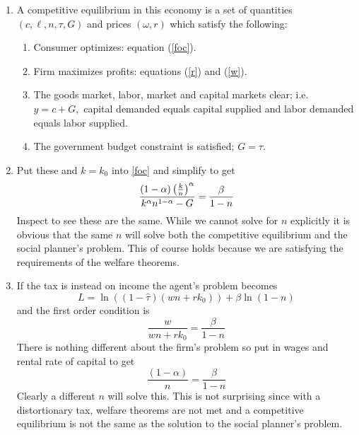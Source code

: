 \documentclass{article}
\begin{document}
\begin{enumerate}
\begin{enumerate}
\item A competitive equilibrium in this economy is a set of quantities $%
\left( c,\ell ,n,\tau ,G\right) $ and prices $\left( \omega ,r\right) $
which satisfy the following:

\begin{enumerate}
\item Consumer optimizes: equation (\ref{foc}).

\item Firm maximizes profits: equations (\ref{r}) and (\ref{w}).

\item The goods market, labor, market and capital markets clear; i.e. $%
y=c+G, $ capital demanded equals capital supplied and labor demanded equals
labor supplied.

\item The government budget constraint is satisfied; $G=\tau $.
\end{enumerate}

\item Put these and $k=k_{0}$ into \ref{foc} and simplify to get \ 
\begin{equation*}
\frac{\left( 1-\alpha \right) \left( \frac{k}{n}\right) ^{\alpha }}{%
k^{\alpha }n^{1-\alpha }-G}=\frac{\beta }{1-n}
\end{equation*}%
Inspect to see these are the same. While we cannot solve for $n$ explicitly
it is obvious that the same $n$ will solve both the competitive equilibrium
and the social planner's problem. This of course holds because we are
satisfying the requirements of the welfare theorems.

\item If the tax is instead on income the agent's problem becomes 
\begin{equation*}
L=\ln \left( \left( 1-\hat{\tau}\right) \left( wn+rk_{0}\right) \right)
+\beta \ln \left( 1-n\right)
\end{equation*}%
and the first order condition is 
\begin{equation*}
\frac{w}{wn+rk_{0}}=\frac{\beta }{1-n}
\end{equation*}%
There is nothing different about the firm's problem so put in wages and
rental rate of capital to get 
\begin{equation*}
\frac{\left( 1-\alpha \right) }{n}=\frac{\beta }{1-n}
\end{equation*}%
Clearly a different $n$ will solve this. This is not surprising since with a
distortionary tax, welfare theorems are not met and a competitive
equilibrium is not the same as the solution to the social planner's problem.


\end{enumerate}
\end{enumerate}
\end{document}

